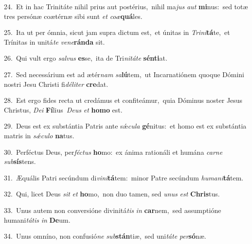 {\numbfont\textcolor{\numbcolor}{24.}}~Et in hac Trinitáte nihil prius aut postérius,~\dagger nihil ma\textit{jus} \textit{aut} \textbf{mi}\-nus:~\star sed totæ tres persónæ coætérnæ sibi sunt \textit{et} \textit{co}\-\textit{æ}\textbf{quá}les.\par
{\numbfont\textcolor{\numbcolor}{25.}}~Ita ut per ómnia, sicut jam supra dictum est,~\dagger et únitas in \textit{Tri}\-\textit{ni}\textbf{tá}te,~\star et Trínitas in unitá\textit{te} \textit{ve}\-\textit{ne}\textbf{rán}\textbf{da} sit.\par
{\numbfont\textcolor{\numbcolor}{26.}}~Qui vult ergo \textit{sal}\-\textit{vus} \textbf{es}\-se,~\star ita de Tri\-\textit{ni}\-\textit{tá}\textit{te} \textbf{sén}\-\textbf{ti}at.\par
{\numbfont\textcolor{\numbcolor}{27.}}~Sed necessárium est ad ætér\textit{nam} \textit{sa}\-\textbf{lú}tem,~\star ut Incarnatiónem quoque Dómini nostri Jesu Christi fi\-\textit{dé}\-\textit{li}\textit{ter} \textbf{cre}\-dat.\par
{\numbfont\textcolor{\numbcolor}{28.}}~Est ergo fides recta ut credámus et confiteámur,~\dagger quia Dóminus noster Jesus Christus, \textit{De}\-\textit{i} \textbf{Fí}\-lius~\star \textit{De}\-\textit{us} \textit{et} \textbf{ho}\-\textbf{mo} est.\par
{\numbfont\textcolor{\numbcolor}{29.}}~Deus est ex substántia Patris ante sǽ\-\textit{cu}\-\textit{la} \textbf{gé}\-nitus:~\star et homo est ex substántia matris in \textit{sǽ}\-\textit{cu}\textit{lo} \textbf{na}\-tus.\par
{\numbfont\textcolor{\numbcolor}{30.}}~Perféctus Deus, per\-\textit{féc}\-\textit{tus} \textbf{ho}\-mo:~\star ex ánima rationáli et humána \textit{car}\-\textit{ne} \textit{sub}\-\textbf{sís}tens.\par
{\numbfont\textcolor{\numbcolor}{31.}}~Æquális Patri secúndum di\-\textit{vi}\-\textit{ni}\textbf{tá}tem:~\star minor Patre secúndum \textit{hu}\-\textit{ma}\textit{ni}\textbf{tá}tem.\par
{\numbfont\textcolor{\numbcolor}{32.}}~Qui, licet Deus \textit{sit} \textit{et} \textbf{ho}\-mo,~\star non duo tamen, sed \textit{u}\-\textit{nus} \textit{est} \textbf{Chris}\-tus.\par
{\numbfont\textcolor{\numbcolor}{33.}}~Unus autem non conversióne divinitá\textit{tis} \textit{in} \textbf{car}\-nem,~\star sed assumptióne humani\-\textit{tá}\-\textit{tis} \textit{in} \textbf{De}\-um.\par
{\numbfont\textcolor{\numbcolor}{34.}}~Unus omníno, non confusió\textit{ne} \textit{sub}\-\textbf{stán}tiæ,~\star sed uni\-\textit{tá}\-\textit{te} \textit{per}\-\textbf{só}næ.\par
